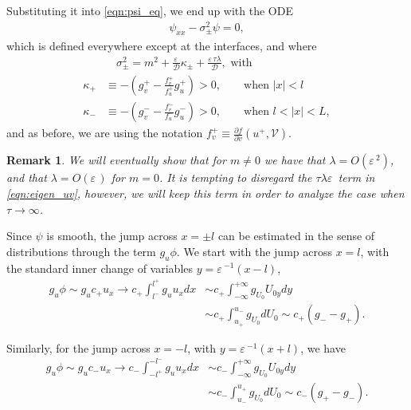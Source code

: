 \documentclass[a4paper,10pt]{article}
\newcommand{\lA}{\ensuremath{\lambda}}
\newcommand{\sI}{\ensuremath{\sigma}}
\newcommand{\kA}{\ensuremath{\kappa}}
\newcommand{\Ep}{\ensuremath{\varepsilon\,}}
\newcommand{\pAr}[2]{\ensuremath{\frac{\partial#2}{\partial#1}}}
\newcommand{\DD}{\ensuremath{\mathcal{D}}}
\newcommand{\VV}{\ensuremath{\mathcal{V}}}
\newtheorem{remark}{Remark}
\begin{document}
Substituting it into \eqref{eqn:psi_eq}, we end up with the ODE
% 
\begin{equation}
\label{eqn:psi_aprox}
\begin{split}
	\psi_{xx} - \sI_{\pm}^2\psi = 0,
\end{split}
\end{equation}
% 
which is defined everywhere except at the interfaces, and where
% 
\begin{equation*}
\begin{split}
	&\quad\sI_{\pm}^2 = m^2  + \frac{\Ep}{\DD}\kA_{\pm} + \frac{\Ep\tau\lA}{\DD}, \text{ with}\\
	\kA_+ &\equiv - \left(g_v^+ - \frac{f_v^+}{f_u^+}g_u^+ \right)>0,\qquad \text{when }|x|<l \\
	\kA_- &\equiv - \left(g_v^- - \frac{f_v^-}{f_u^-}g_u^- \right)>0,\qquad \text{when }l<|x|<L,
\end{split}
\end{equation*}
% 
and as before, we are using the notation $f_v^+\equiv \pAr vf(u^+,\VV)$.

\begin{remark}
	We will eventually show that for $m\neq0$ we have that $\lA=O(\Ep^2)$, and that $\lA=O(\Ep)$ for $m=0$. It is tempting to disregard the $\tau\lA\Ep$ term in \eqref{eqn:eigen_uv}, however, we will keep this term in order to analyze the case when $\tau\rightarrow\infty$.
\end{remark}

Since $\psi$ is smooth, the jump across $x=\pm l$ can be estimated in the sense of distributions through the term $g_u\phi$. We start with the jump across $x=l$, with the standard inner change of variables $y=\Ep^{-1}(x-l)$,
% 
\begin{equation*}
\begin{split}
	g_u\phi\sim g_u c_+u_x\rightarrow c_+\int_{l^-}^{l^+}g_uu_xdx 
	&\sim c_+\int_{-\infty}^{+\infty}g_{U_0}U_{0y}dy \\
	&\sim c_+\int_{u_+}^{u_-}g_{U_0}dU_0\sim c_+(g_- - g_+).
\end{split}
\end{equation*}
% 

Similarly, for the jump across $x=-l$, with $y=\Ep^{-1}(x+l)$, we have
% 
\begin{equation*}
\begin{split}
	g_u\phi\sim g_u c_-u_x\rightarrow c_-\int_{-l^+}^{-l^-}g_uu_xdx 
	&\sim c_-\int_{-\infty}^{+\infty}g_{U_0}U_{0y}dy \\
	&\sim c_-\int_{u_-}^{u_+}g_{U_0}dU_0\sim c_-(g_+ - g_-).
\end{split}
\end{equation*}
% 
\end{document}
